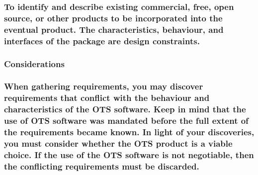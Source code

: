\documentclass[
]{article}
\begin{document}
\hypertarget{to-identify-and-describe-existing-commercial-free-open-source-or-other-products-to-be-incorporated-into-the-eventual-product.-the-characteristics-behaviour-and-interfaces-of-the-package-are-design-constraints.}{%
\subsubsection{\texorpdfstring{To identify and describe existing
commercial, free, open source, or other products to be incorporated into
the eventual product. The characteristics, behaviour, and interfaces of
the package are design constraints.
}{To identify and describe existing commercial, free, open source, or other products to be incorporated into the eventual product. The characteristics, behaviour, and interfaces of the package are design constraints. }}\label{to-identify-and-describe-existing-commercial-free-open-source-or-other-products-to-be-incorporated-into-the-eventual-product.-the-characteristics-behaviour-and-interfaces-of-the-package-are-design-constraints.}}

\hypertarget{considerations-5}{%
\subsubsection{Considerations}\label{considerations-5}}

\hypertarget{when-gathering-requirements-you-may-discover-requirements-that-conflict-with-the-behaviour-and-characteristics-of-the-ots-software.-keep-in-mind-that-the-use-of-ots-software-was-mandated-before-the-full-extent-of-the-requirements-became-known.-in-light-of-your-discoveries-you-must-consider-whether-the-ots-product-is-a-viable-choice.-if-the-use-of-the-ots-software-is-not-negotiable-then-the-conflicting-requirements-must-be-discarded.}{%
\subsubsection{When gathering requirements, you may discover
requirements that conflict with the behaviour and characteristics of the
OTS software. Keep in mind that the use of OTS software was mandated
before the full extent of the requirements became known. In light of
your discoveries, you must consider whether the OTS product is a viable
choice. If the use of the OTS software is not negotiable, then the
conflicting requirements must be
discarded.}\label{when-gathering-requirements-you-may-discover-requirements-that-conflict-with-the-behaviour-and-characteristics-of-the-ots-software.-keep-in-mind-that-the-use-of-ots-software-was-mandated-before-the-full-extent-of-the-requirements-became-known.-in-light-of-your-discoveries-you-must-consider-whether-the-ots-product-is-a-viable-choice.-if-the-use-of-the-ots-software-is-not-negotiable-then-the-conflicting-requirements-must-be-discarded.}}
\end{document}
